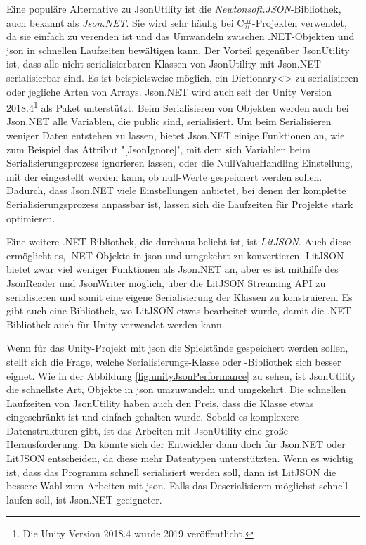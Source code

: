 Eine populäre Alternative zu JsonUtility ist die \textit{Newtonsoft.JSON}-Bibliothek, auch bekannt als \textit{Json.NET}. Sie wird sehr häufig bei C\#-Projekten verwendet, da sie einfach zu verenden ist und das Umwandeln zwischen .NET-Objekten und \ac{json} in schnellen Laufzeiten bewältigen kann.\cite{newtonsoftJsonNETNewtonsoft} Der Vorteil gegenüber JsonUtility ist, dass alle nicht serialisierbaren Klassen von JsonUtility mit Json.NET serialisierbar sind. Es ist beispielsweise möglich, ein Dictionary<> zu serialisieren\cite{newtonsoftSerializeDictionary}\cite{newtonsoftDeserializeDictionary} oder jegliche Arten von Arrays. Json.NET wird auch seit der Unity Version 2018.4\footnote{Die Unity Version 2018.4 wurde 2019 veröffentlicht.\cite{unityDownloadArchive}} als Paket unterstützt.\cite{NewtonsoftJsonUnitySupport} Beim Serialisieren von Objekten werden auch bei Json.NET alle Variablen, die public sind, serialisiert. Um beim Serialisieren weniger Daten entstehen zu lassen, bietet Json.NET einige Funktionen an, wie zum Beispiel das Attribut "[JsonIgnore]", mit dem sich Variablen beim Serialisierungsprozess ignorieren lassen, oder die NullValueHandling Einstellung, mit der eingestellt werden kann, ob null-Werte gespeichert werden sollen. Dadurch, dass Json.NET viele Einstellungen anbietet, bei denen der komplette Serialisierungsprozess anpassbar ist, lassen sich die Laufzeiten für Projekte stark optimieren.\cite{newtonsoftReducingSerialized}\cite{newtonsoftPerformanceTips}

Eine weitere .NET-Bibliothek, die durchaus beliebt ist, ist \textit{LitJSON}. Auch diese ermöglicht es, .NET-Objekte in \ac{json} und umgekehrt zu konvertieren.\cite{litjsonLitJSONDocumentation} LitJSON bietet zwar viel weniger Funktionen als Json.NET an, aber es ist mithilfe des JsonReader und JsonWriter möglich, über die LitJSON Streaming API zu serialisieren und somit eine eigene Serialisierung der Klassen zu konstruieren.\cite{litjsonLitJSONReaders} Es gibt auch eine Bibliothek, wo LitJSON etwas bearbeitet wurde, damit die .NET-Bibliothek auch für Unity verwendet werden kann.\cite{githubGitHubMervillUnityLitJson}

Wenn für das Unity-Projekt mit \ac{json} die Spielstände gespeichert werden sollen, stellt sich die Frage, welche Serialisierungs-Klasse oder -Bibliothek sich besser eignet. Wie in der Abbildung \ref{fig:unityJsonPerformance} zu sehen, ist JsonUtility die schnellste Art, Objekte in \ac{json} umzuwandeln und umgekehrt. Die schnellen Laufzeiten von JsonUtility haben auch den Preis, dass die Klasse etwas eingeschränkt ist und einfach gehalten wurde. Sobald es komplexere Datenstrukturen gibt, ist das Arbeiten mit JsonUtility eine große Herausforderung. Da könnte sich der Entwickler dann doch für Json.NET oder LitJSON entscheiden, da diese mehr Datentypen unterstützten. Wenn es wichtig ist, dass das Programm schnell serialisiert werden soll, dann ist LitJSON die bessere Wahl zum Arbeiten mit \ac{json}. Falls das Deserialisieren möglichst schnell laufen soll, ist Json.NET geeigneter.

